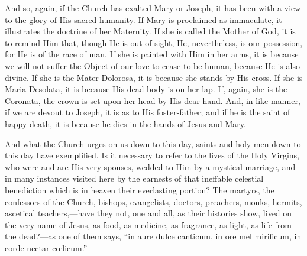 And so, again, if the Church has exalted Mary or
Joseph, it has been with a view to the glory of His
sacred humanity. If Mary is proclaimed as immaculate, it
illustrates the doctrine of her Maternity. If she is
called the Mother of God, it is to remind Him that,
though He is out of sight, He, nevertheless, is our
possession, for He is of the race of man. If she is
painted with Him in her arms, it is because we will not
suffer the Object of our love to cease to be human,
because He is also divine. If she is the Mater Dolorosa,
it is because she stands by His cross. If she is Maria
Desolata, it is because His dead body is on her lap. If,
again, she is the Coronata, the crown is set upon her
head by His dear hand. And, in like manner, if we are
devout to Joseph, it is as to His foster-father; and if
he is the saint of happy death, it is because he dies in
the hands of Jesus and Mary.

And what the Church urges on us down to this day,
saints and holy men down to this day have exemplified. Is
it necessary to refer to the lives of the Holy Virgins,
who were and are His very spouses, wedded to Him by a
mystical marriage, and in many instances visited here by
the earnests of that ineffable celestial benediction
which is in heaven their everlasting portion? The
martyrs, the confessors of the Church, bishops,
evangelists, doctors, preachers, monks, hermits,
ascetical teachers,—have they not, one and all, as
their histories show, lived on the very name of Jesus, as
food, as medicine, as fragrance, as light, as life from
the dead?—as one of them says, ``in aure dulce canticum, in ore mel
mirificum, in corde nectar cœlicum.''

